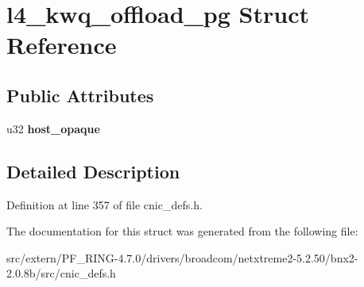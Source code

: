 \hypertarget{structl4__kwq__offload__pg}{
\section{l4\_\-kwq\_\-offload\_\-pg Struct Reference}
\label{structl4__kwq__offload__pg}
}
\subsection*{Public Attributes}
\begin{DoxyCompactItemize}
\item 
\hypertarget{structl4__kwq__offload__pg_ac3819471e3ec17aa7931ba5a6f258ef2}{
u32 {\bfseries host\_\-opaque}}
\label{structl4__kwq__offload__pg_ac3819471e3ec17aa7931ba5a6f258ef2}

\end{DoxyCompactItemize}


\subsection{Detailed Description}


Definition at line 357 of file cnic\_\-defs.h.



The documentation for this struct was generated from the following file:\begin{DoxyCompactItemize}
\item 
src/extern/PF\_\-RING-\/4.7.0/drivers/broadcom/netxtreme2-\/5.2.50/bnx2-\/2.0.8b/src/cnic\_\-defs.h\end{DoxyCompactItemize}
